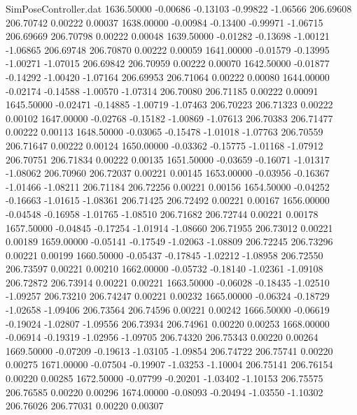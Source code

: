 \begin{filecontents}{SimPoseController.dat}
1636.50000   -0.00686   -0.13103    -0.99822   -1.06566  206.69608  206.70742    0.00222    0.00037
1638.00000   -0.00984   -0.13400    -0.99971   -1.06715  206.69669  206.70798    0.00222    0.00048
1639.50000   -0.01282   -0.13698    -1.00121   -1.06865  206.69748  206.70870    0.00222    0.00059
1641.00000   -0.01579   -0.13995    -1.00271   -1.07015  206.69842  206.70959    0.00222    0.00070
1642.50000   -0.01877   -0.14292    -1.00420   -1.07164  206.69953  206.71064    0.00222    0.00080
1644.00000   -0.02174   -0.14588    -1.00570   -1.07314  206.70080  206.71185    0.00222    0.00091
1645.50000   -0.02471   -0.14885    -1.00719   -1.07463  206.70223  206.71323    0.00222    0.00102
1647.00000   -0.02768   -0.15182    -1.00869   -1.07613  206.70383  206.71477    0.00222    0.00113
1648.50000   -0.03065   -0.15478    -1.01018   -1.07763  206.70559  206.71647    0.00222    0.00124
1650.00000   -0.03362   -0.15775    -1.01168   -1.07912  206.70751  206.71834    0.00222    0.00135
1651.50000   -0.03659   -0.16071    -1.01317   -1.08062  206.70960  206.72037    0.00221    0.00145
1653.00000   -0.03956   -0.16367    -1.01466   -1.08211  206.71184  206.72256    0.00221    0.00156
1654.50000   -0.04252   -0.16663    -1.01615   -1.08361  206.71425  206.72492    0.00221    0.00167
1656.00000   -0.04548   -0.16958    -1.01765   -1.08510  206.71682  206.72744    0.00221    0.00178
1657.50000   -0.04845   -0.17254    -1.01914   -1.08660  206.71955  206.73012    0.00221    0.00189
1659.00000   -0.05141   -0.17549    -1.02063   -1.08809  206.72245  206.73296    0.00221    0.00199
1660.50000   -0.05437   -0.17845    -1.02212   -1.08958  206.72550  206.73597    0.00221    0.00210
1662.00000   -0.05732   -0.18140    -1.02361   -1.09108  206.72872  206.73914    0.00221    0.00221
1663.50000   -0.06028   -0.18435    -1.02510   -1.09257  206.73210  206.74247    0.00221    0.00232
1665.00000   -0.06324   -0.18729    -1.02658   -1.09406  206.73564  206.74596    0.00221    0.00242
1666.50000   -0.06619   -0.19024    -1.02807   -1.09556  206.73934  206.74961    0.00220    0.00253
1668.00000   -0.06914   -0.19319    -1.02956   -1.09705  206.74320  206.75343    0.00220    0.00264
1669.50000   -0.07209   -0.19613    -1.03105   -1.09854  206.74722  206.75741    0.00220    0.00275
1671.00000   -0.07504   -0.19907    -1.03253   -1.10004  206.75141  206.76154    0.00220    0.00285
1672.50000   -0.07799   -0.20201    -1.03402   -1.10153  206.75575  206.76585    0.00220    0.00296
1674.00000   -0.08093   -0.20494    -1.03550   -1.10302  206.76026  206.77031    0.00220    0.00307

\end{filecontents}
